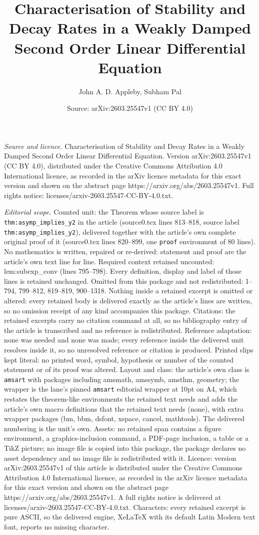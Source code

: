 \documentclass[10pt,a4paper]{amsart}
\title[Characterisation of Stability and Decay Rates in a Weakly Da]{Characterisation of Stability and Decay Rates in a Weakly Damped Second Order Linear Differential Equation}
\author{John A. D. Appleby, Subham Pal}
\date{Source: arXiv:2603.25547v1 (CC BY 4.0)}
\begin{document}
\maketitle

\noindent\emph{Source and licence.} Characterisation of Stability and Decay Rates in a Weakly Damped Second Order Linear Differential Equation. Version arXiv:2603.25547v1 (CC BY 4.0), distributed under the Creative Commons Attribution 4.0 International licence, as recorded in the arXiv licence metadata for this exact version and shown on the abstract page https://arxiv.org/abs/2603.25547v1. Full rights notice: licenses/arxiv-2603.25547-CC-BY-4.0.txt.\par\smallskip

\noindent\textit{Editorial scope.} Counted unit: the Theorem whose source label is \texttt{thm:asymp\_implies\_y2} in the article (source0.tex lines 813--818, source label \texttt{thm:asymp\_implies\_y2}), delivered together with the article's own complete original proof of it (source0.tex lines 820--899, one \texttt{proof} environment of 80 lines). No mathematics is written, repaired or re-derived: statement and proof are the article's own text line for line. Required context retained uncounted: lem:subexp\_conv (lines 795--798). Every definition, display and label of those lines is retained unchanged. Omitted from this package and not redistributed: 1--794, 799--812, 819--819, 900--1318. Nothing inside a retained excerpt is omitted or altered: every retained body is delivered exactly as the article's lines are written, so no omission receipt of any kind accompanies this package. Citations: the retained excerpts carry no citation command at all, so no bibliography entry of the article is transcribed and no reference is redistributed. Reference adaptation: none was needed and none was made; every reference inside the delivered unit resolves inside it, so no unresolved reference or citation is produced. Printed slips kept literal: no printed word, symbol, hypothesis or number of the counted statement or of its proof was altered. Layout and class: the article's own class is \texttt{amsart} with packages including amsmath, amssymb, amsthm, geometry; the wrapper is the lane's pinned \texttt{amsart} editorial wrapper at 10pt on A4, which restates the theorem-like environments the retained text needs and adds the article's own macro definitions that the retained text needs (none), with extra wrapper packages (bm, bbm, dsfont, xspace, cancel, mathtools). The delivered numbering is the unit's own. Assets: no retained span contains a figure environment, a graphics-inclusion command, a PDF-page inclusion, a table or a TikZ picture; no image file is copied into this package, the package declares no asset dependency and no image file is redistributed with it. Licence: version arXiv:2603.25547v1 of this article is distributed under the Creative Commons Attribution 4.0 International licence, as recorded in the arXiv licence metadata for this exact version and shown on the abstract page https://arxiv.org/abs/2603.25547v1. A full rights notice is delivered at licenses/arxiv-2603.25547-CC-BY-4.0.txt. Characters: every retained excerpt is pure ASCII, so the delivered engine, XeLaTeX with its default Latin Modern text font, reports no missing character.
\end{document}
